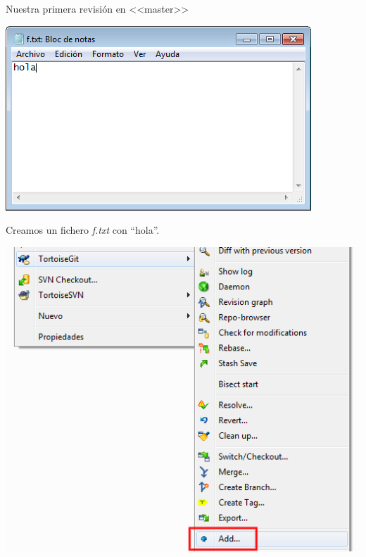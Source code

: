 \documentclass[xcolor=svgnames]{beamer}
\newcommand*{\fichero}[1]{\textit{#1}}
\begin{document}
\begin{frame}[t]{Nuestra primera revisión en <<master>>}

  \begin{overprint}
    \begin{center}
      \includegraphics[width=\textwidth,height=.6\textheight,keepaspectratio]{tomas/primercommit-06-newfile}

      \vfill

      Creamos un fichero \fichero{f.txt} con ``hola''.
    \end{center}

    \begin{center}
      \includegraphics[width=\textwidth,height=.6\textheight,keepaspectratio]{tomas/primercommit-00-add}


\end{center}
\end{overprint}
\end{frame}
\end{document}
